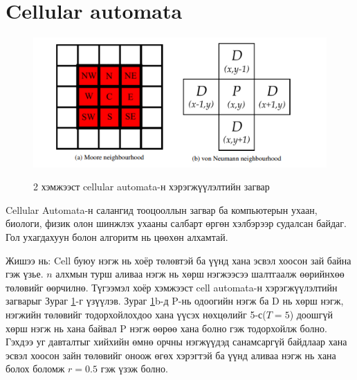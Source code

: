 \section{Cellular automata}
\begin{figure}[H]
	\centering
	\caption{2 хэмжээст cellular automata-н хэрэгжүүлэлтийн загвар}
	\includegraphics[width=\textwidth]{./images/cellular_automata.png}
	\label{fig:CellularAutomata}
\end{figure}

Cellular Automata-н салангид тооцооллын загвар ба компьютерын ухаан, биологи, физик олон шинжлэх ухааны салбарт өргөн хэлбэрээр судалсан байдаг. Гол ухагдахуун болон алгоритм нь цөөхөн алхамтай.

Жишээ нь:
Cell буюу нэгж нь хоёр төлөвтэй ба үүнд хана эсвэл хоосон зай байна гэж үзье.
\(n\) алхмын турш аливаа нэгж нь хөрш нэгжээсээ шалтгаалж өөрийнхөө төлөвийг өөрчилнө. Түгээмэл хоёр хэмжээст cell automata-н хэрэгжүүлэлтийн загварыг Зураг \ref{fig:CellularAutomata}-г үзүүлэв. Зураг \ref{fig:CellularAutomata}b-д\cite{PCGinGames2016} P-нь одоогийн нэгж ба D нь хөрш нэгж, нэгжийн төлөвийг тодорхойлохдоо хана үүсэх нөхцөлийг 5-с(\(T=5\)) доошгүй хөрш нэгж нь хана байвал P нэгж өөрөө хана болно гэж тодорхойлж болно. Гэхдээ уг давталтыг хийхийн өмнө орчны нэгжүүдэд санамсаргүй байдлаар хана эсвэл хоосон зайн төлөвийг оноож өгөх хэрэгтэй ба үүнд аливаа нэгж нь хана болох боломж \(r=0.5\) гэж үзэж болно.


